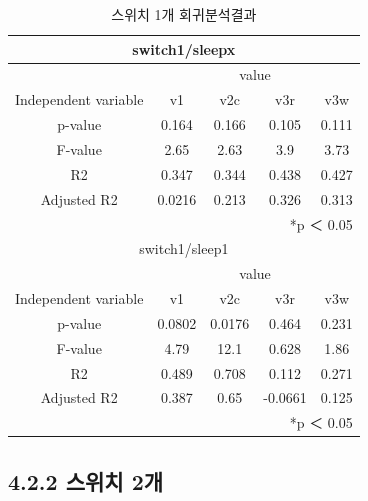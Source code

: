\documentclass[11pt
  , a4paper
  , article
  , oneside
]{memoir}
\begin{document}
\begin{table}[h!]
\begin{center}
\begin{tabular}{c|c||c||c||c}\hline
\multicolumn{5}{c}{switch1/sleepx}\\ \hline\hline
\multicolumn{1}{c|}{}& \multicolumn{4}{c}{value}\\
\cline{1-5}
Independent variable & v1 & v2c & v3r & v3w      \\ \hline\hline
p-value &  0.164 &  0.166 & 0.105  &  0.111\\ 
F-value &  2.65 &  2.63&  3.9 &  3.73\\ 
R2 &  0.347  &  0.344&  0.438 &  0.427\\ 
Adjusted R2 & 0.0216 & 0.213 & 0.326 & 0.313\\ \hline\hline
\multicolumn{5}{r}{*p ＜ 0.05} \\ \hline \hline
\multicolumn{5}{c}{switch1/sleep1}\\ \hline\hline
\multicolumn{1}{c|}{}& \multicolumn{4}{c}{value}\\
\cline{1-5}
Independent variable & v1 & v2c & v3r & v3w     \\ \hline\hline
p-value &  0.0802 &  0.0176& 0.464 &  0.231\\ 
F-value &  4.79  &  12.1&  0.628 &  1.86\\ 
R2 &  0.489 &  0.708 &  0.112  &  0.271\\ 
Adjusted R2 & 0.387 & 0.65 & -0.0661 & 0.125\\ \hline
\multicolumn{5}{r}{*p ＜ 0.05} \\ \hline\hline
\end{tabular}
\caption{ 스위치 1개 회귀분석결과 }
\end{center}
\end{table} 

\clearpage
\subsection{4.2.2 스위치 2개}
\end{document}
